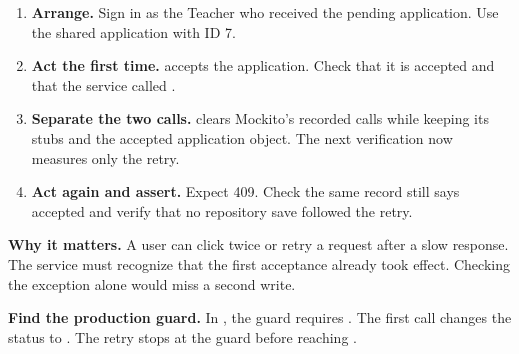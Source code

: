 \begin{enumerate}
\item \textbf{Arrange.} Sign in as the Teacher who received the pending
application. Use the shared application with ID 7.
\item \textbf{Act the first time.}  accepts the
application. Check that it is accepted and that the service called
.
\item \textbf{Separate the two calls.}  clears Mockito's
recorded calls while keeping its stubs and the accepted application object.
The next verification now measures only the retry.
\item \textbf{Act again and assert.} Expect 409. Check the same record still
says accepted and verify that no repository save followed the retry.
\end{enumerate}

\textbf{Why it matters.}
A user can click twice or retry a request after a slow response. The service
must recognize that the first acceptance already took effect. Checking the
exception alone would miss a second write.

\textbf{Find the production guard.}
In , the guard requires .
The first call changes the status to . The retry stops at the
guard before reaching .

\clearpage
